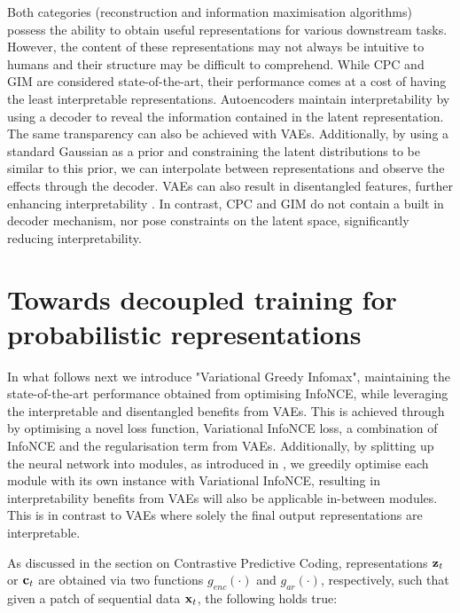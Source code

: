 		Both categories (reconstruction and information maximisation algorithms) possess the ability to obtain useful representations for various downstream tasks. However, the content of these representations may not always be intuitive to humans and their structure may be difficult to comprehend. While CPC and GIM are considered state-of-the-art, their performance comes at a cost of having the least interpretable representations. Autoencoders maintain interpretability by using a decoder to reveal the information contained in the latent representation. The same transparency can also be achieved with VAEs. Additionally, by using a standard Gaussian as a prior and constraining the latent distributions to be similar to this prior, we can interpolate between representations and observe the effects through the decoder. VAEs can also result in disentangled features, further enhancing interpretability \cite{grossuttiDeepLearningInfrared2022}. In contrast, CPC and GIM do not contain a built in decoder mechanism, nor pose constraints on the latent space, significantly reducing interpretability.
		


\section{Towards decoupled training for probabilistic representations}
		In what follows next we introduce "Variational Greedy Infomax", maintaining the state-of-the-art performance obtained from optimising InfoNCE, while leveraging the interpretable and disentangled benefits from VAEs. This is achieved through by optimising a novel loss function, Variational InfoNCE loss, a combination of InfoNCE and the regularisation term from VAEs. Additionally, by splitting up the neural network into modules, as introduced in \cite{lowePuttingEndEndtoEnd2020}, we greedily optimise each module with its own instance with Variational InfoNCE, resulting in interpretability benefits from VAEs will also be applicable in-between modules. This is in contrast to VAEs where solely the final output representations are interpretable.		
				
		
		As discussed in the section on Contrastive Predictive Coding, representations $\mathbf{z}_t$ or $\mathbf{c}_t$ are obtained via two functions $g_{enc}(\cdot)$ and $g_{ar}(\cdot)$, respectively, such that given a patch of sequential data $\mathbf{x}_t$, the following holds true:
	
